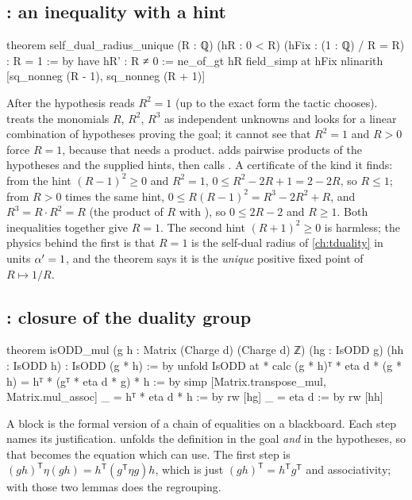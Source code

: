 \subsection{: an inequality with a hint}
\begin{leancode}
theorem self_dual_radius_unique (R : ℚ) (hR : 0 < R) (hFix : (1 : ℚ) / R = R) :
    R = 1 := by
  have hR' : R ≠ 0 := ne_of_gt hR
  field_simp at hFix
  nlinarith [sq_nonneg (R - 1), sq_nonneg (R + 1)]
\end{leancode}
After  the hypothesis reads $R^2=1$ (up to the exact form the
tactic chooses).  treats the monomials $R$, $R^2$, $R^3$ as independent
unknowns and looks for a linear combination of hypotheses proving the goal; it cannot see
that $R^2=1$ and $R>0$ force $R=1$, because that needs a product.  adds
pairwise products of the hypotheses and the supplied hints, then calls . A
certificate of the kind it finds: from the hint $(R-1)^2\ge0$ and $R^2=1$,
$0\le R^2-2R+1 = 2-2R$, so $R\le1$; from $R>0$ times the same hint, $0\le R(R-1)^2 =
R^3-2R^2+R$, and $R^3=R\cdot R^2=R$ (the product of $R$ with ), so
$0\le 2R-2$ and $R\ge1$. Both inequalities together give $R=1$. The second hint
$(R+1)^2\ge0$ is harmless; the physics behind the first is that $R=1$ is the self-dual
radius of \cref{ch:tduality} in units $\alpha'=1$, and the theorem says it is the
\emph{unique} positive fixed point of $R\mapsto1/R$.

\subsection{: closure of the duality group}
\begin{leancode}
theorem isODD_mul (g h : Matrix (Charge d) (Charge d) ℤ) (hg : IsODD g)
    (hh : IsODD h) : IsODD (g * h) := by
  unfold IsODD at *
  calc (g * h)ᵀ * eta d * (g * h)
    = hᵀ * (gᵀ * eta d * g) * h := by
        simp [Matrix.transpose_mul, Matrix.mul_assoc]
    _ = hᵀ * eta d * h := by rw [hg]
    _ = eta d := by rw [hh]
\end{leancode}
A  block is the formal version of a chain of equalities on a blackboard. Each
step names its justification.  unfolds the definition in the goal
\emph{and} in the hypotheses, so that  becomes the equation
 which  can use. The first step is
$(gh)^{\mathsf T}\eta(gh) = h^{\mathsf T}(g^{\mathsf T}\eta g)h$, which is just
$(gh)^{\mathsf T}=h^{\mathsf T}g^{\mathsf T}$ and associativity;  with those two
lemmas does the regrouping.

